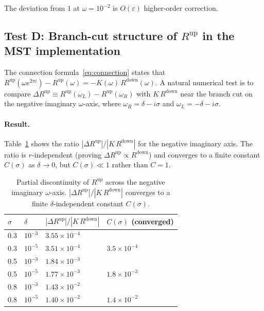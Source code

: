 \documentclass[12pt,a4paper]{article}
\newcommand{\Rup}{R^{\mathrm{up}}}
\newcommand{\Rdown}{R^{\mathrm{down}}}
\begin{document}
The deviation from $1$ at $\omega = 10^{-2}$ is $O(\varepsilon)$ higher-order correction.

\subsection{Test D: Branch-cut structure of \texorpdfstring{$\Rup$}{Rup} in the MST implementation}

The connection formula~\eqref{eq:connection} states that
$\Rup(\omega e^{2\pi i}) - \Rup(\omega) = -K(\omega)\,\Rdown(\omega)$.
A natural numerical test is to compare $\Delta \Rup \equiv \Rup(\omega_L) - \Rup(\omega_R)$
with $K\,\Rdown$ near the branch cut on the negative imaginary $\omega$-axis,
where $\omega_R = \delta - i\sigma$ and $\omega_L = -\delta - i\sigma$.

\paragraph{Result.}
Table~\ref{tab:branchcut} shows the ratio $|\Delta \Rup|/|K\,\Rdown|$ for the
negative imaginary axis.  The ratio is $r$-independent (proving $\Delta \Rup \propto \Rdown$)
and converges to a finite constant $C(\sigma)$ as $\delta \to 0$, but $C(\sigma) \ll 1$
rather than $C = 1$.

\begin{table}[ht]
\centering
\caption{Partial discontinuity of $\Rup$ across the negative imaginary $\omega$-axis.
$|\Delta \Rup|/|K\,\Rdown|$ converges to a finite $\delta$-independent constant $C(\sigma)$.}
\label{tab:branchcut}
\begin{tabular}{llll}
\toprule
$\sigma$ & $\delta$ & $|\Delta \Rup|/|K\,\Rdown|$ & $C(\sigma)$ (converged) \\
\midrule
0.3 & $10^{-3}$ & $3.55 \times 10^{-4}$ & \\
0.3 & $10^{-5}$ & $3.51 \times 10^{-4}$ & $3.5 \times 10^{-4}$ \\
0.5 & $10^{-3}$ & $1.84 \times 10^{-3}$ & \\
0.5 & $10^{-5}$ & $1.77 \times 10^{-3}$ & $1.8 \times 10^{-3}$ \\
0.8 & $10^{-3}$ & $1.43 \times 10^{-2}$ & \\
0.8 & $10^{-5}$ & $1.40 \times 10^{-2}$ & $1.4 \times 10^{-2}$ \\
\bottomrule
\end{tabular}
\end{table}
\end{document}
